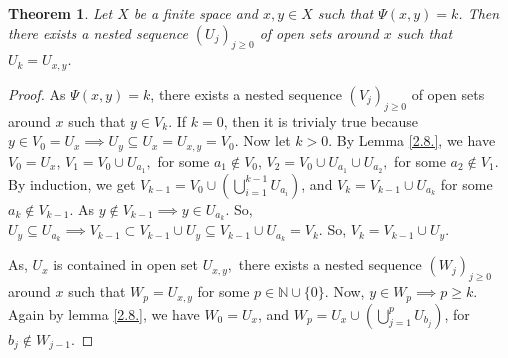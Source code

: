\documentclass[12pt]{amsart}
\newtheorem{theorem}[definition]{Theorem}
\begin{document}
\begin{theorem}\label{2.9.}
	Let $X$ be a finite space and $x,y\in X$ such that $\Psi(x,y)=k$. Then there exists a nested sequence $(U_j)_{j\geq 0}$ of open sets around $x$ such that $U_k=U_{x,y}$.
\end{theorem}
\begin{proof} 
	As  $\Psi(x,y)=k$, there exists a nested sequence $(V_j)_{j\geq 0}$ of open sets around $x$ such that $y\in V_k$. If $k=0$, then it is trivialy true because $y\in V_0=U_x\implies U_y\subseteq U_x=U_{x,y}=V_0$. Now let $k>0$. By Lemma \ref{2.8.}, we have $V_0= U_x$, $V_1= V_0\cup U_{a_1},$ for some $a_1\notin V_0$, $V_2= V_0\cup U_{a_1}\cup U_{a_2},$ for some  $a_2 \notin V_1$. By induction, we get $V_{k-1}= V_0\cup (\bigcup\limits_{i=1}^{k-1} U_{a_i})$, and $V_k= V_{k-1}\cup U_{a_k}$ for some $a_k\notin V_{k-1}$. As $y\notin V_{k-1}\implies y\in U_{a_k}$. So, $U_y\subseteq U_{a_k} \implies V_{k-1}\subset V_{k-1}\cup U_y\subseteq V_{k-1}\cup  U_{a_k} =V_k.$ %
	So, $V_k= V_{k-1}\cup U_y$. \par 
	As, $U_x$ is contained in open set $U_{x,y},$ there exists a nested sequence $(W_j)_{j\geq 0}$ around $x$ such that $W_p=U_{x,y}$ for some $p\in \mathbb{N}\cup\{0\}$. Now, $y\in W_p\implies p\geq k.$ Again by lemma \ref{2.8.}, we have $W_0= U_x$, and
	$W_p= U_x\cup (\bigcup\limits_{j=1}^p U_{b_j})$, for $b_j \notin W_{j-1}$.
	
	
	
	

\end{proof}
\end{document}
